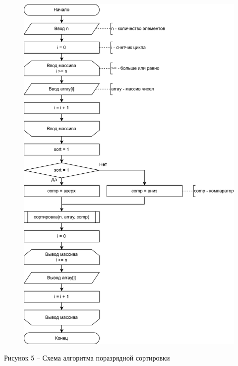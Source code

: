 \documentclass[a4paper,14pt]{extarticle}
\begin{document}
  \pagebreak
  \begin{figure}[h]
    \centering
    \includegraphics[width=0.7\linewidth]{images/s-2-1}
  \end{figure}
  \begin{center}
    Рисунок 5 – Схема алгоритма поразрядной сортировки
  \end{center}
\end{document}
